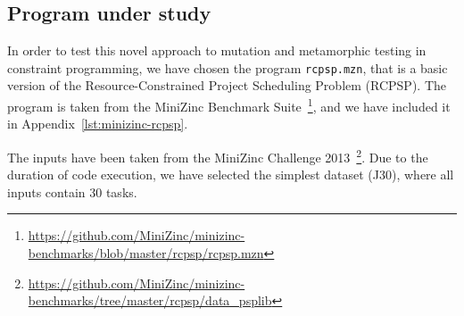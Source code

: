 \subsection{Program under study}
In order to test this novel approach to mutation and metamorphic
testing in constraint programming, we have chosen the program
\lstinline|rcpsp.mzn|, that is a basic version of
the Resource-Constrained Project Scheduling Problem (RCPSP). The
program is taken from the MiniZinc Benchmark
Suite~\footnote{\url{https://github.com/MiniZinc/minizinc-benchmarks/blob/master/rcpsp/rcpsp.mzn}},
and we have included it in Appendix~\ref{lst:minizinc-rcpsp}.

The inputs have been taken from the MiniZinc Challenge
2013~\footnote{\url{https://github.com/MiniZinc/minizinc-benchmarks/tree/master/rcpsp/data_psplib}}. Due
to the duration of code execution, we have selected the simplest
dataset (J30), where all inputs contain 30 tasks.

